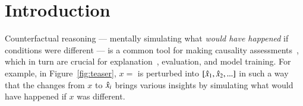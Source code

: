 \section{Introduction}
\label{sec:intro}

Counterfactual reasoning --- mentally simulating what \emph{would have happened} if conditions were different --- is a common tool for making causality assessments~\cite{kahneman}, which in turn are crucial for explanation~\cite{miller}, evaluation, and model training. For example, in Figure~\ref{fig:teaser}, $x=$  is perturbed into $[\hat{x}_1, \hat{x}_2, ...]$ in such a way that the changes from $x$ to $\hat{x}_i$ brings various insights by simulating what would have happened if $x$ was different.

